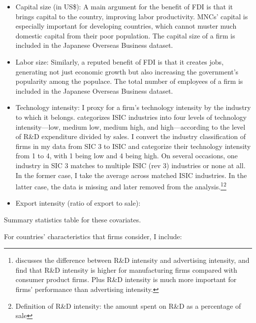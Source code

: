 \begin{itemize}
\item Capital size (in US\$): A main argument for the benefit of FDI is that it
brings capital to the country, improving labor productivity. MNCs' capital is
especially important for developing countries, which cannot muster much domestic
capital from their poor population. The capital size of a firm is included in
the Japanese Overseas Business dataset.

\item Labor size: Similarly, a reputed benefit of FDI is that it creates jobs,
generating not just economic growth but also increasing the government's
popularity among the populace. The total number of employees of a firm is
included in the Japanese Overseas Business dataset.

\item Technology intensity: I proxy for a firm's technology intensity by the
industry to which it belongs. \citet{OECD2009} categorizes ISIC industries into
four levels of technology intensity---low, medium low, medium high, and
high---according to the level of R\&D expenditure divided by sales. I convert
the industry classification of firms in my data from SIC 3 to ISIC and
categorize their technology intensity from 1 to 4, with 1 being low and 4 being
high. On several occasions, one industry in SIC 3 matches to multiple ISIC (rev
3) industries or none at all. In the former case, I take the average across
matched ISIC industries. In the latter case, the data is missing and later
removed from the analysis.\footnote{\cite{Bergstrand2007} discusses the
difference between R\&D intensity and advertising intensity, and find that R\&D
intensity is higher for manufacturing firms compared with consumer product
firms. Plus R\&D intensity is much more important for firms' performance than
advertising intensity.}\footnote{Definition of R\&D intensity: the amount spent
on R\&D as a percentage of sale}

\item Export intensity (ratio of export to sale):
\end{itemize}

Summary statistics table for these covariates.


For countries' characteristics that firms consider, I include:

